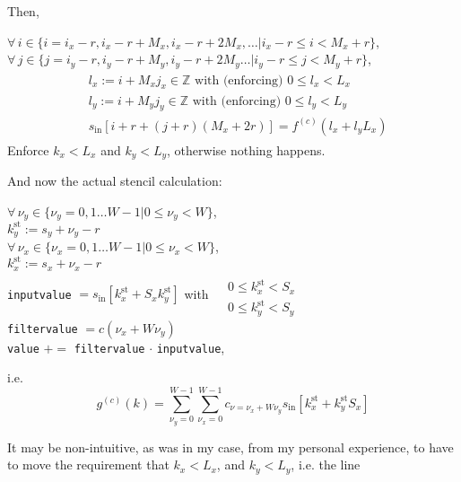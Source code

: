 \documentclass[10pt]{amsart}
\begin{document}
\begin{multicols*}{2}
Then,

$\forall \, i \in \lbrace i = i_x -r, i_x - r +M_x, i_x -r + 2M_x, \dots | i_x - r \leq i < M_x + r \rbrace$, \\
\phantom{ \qquad \, } $\forall \, j \in \lbrace j =i_y - r , i_y - r + M_y, i_y -r + 2M_y \dots | i_y - r \leq j < M_y + r \rbrace$,
\[
\begin{gathered}
  \begin{aligned}
    & l_x := i + M_x j_x \in \mathbb{Z} \text{ with (enforcing) } 0 \leq l_x < L_x \\ 
    & l_y := i + M_y j_y \in \mathbb{Z} \text{ with (enforcing) } 0 \leq l_y < L_y \\ 
    & s_{\text{in}}[i+r + (j+r)(M_x + 2r) ] = f^{(c)}(l_x + l_yL_x)
    \end{aligned}
\end{gathered}
\]
Enforce $k_x <L_x$ and $k_y <L_y$, otherwise nothing happens.  

And now the actual stencil calculation:

$\forall \, \nu_y \in \lbrace \nu_y = 0 , 1 \dots W-1 | 0 \leq \nu_y < W \rbrace$, \\
\phantom{ \qquad \, } $k_y^{\text{st}} := s_y + \nu_y - r$ \\
\phantom{ \qquad \, } $\forall \, \nu_x \in \lbrace \nu_x = 0 , 1 \dots W-1 | 0 \leq \nu_x < W \rbrace$, \\
\phantom{ \qquad \qquad \, } $k_x^{\text{st}} := s_x + \nu_x -r $ \\
\phantom{ \qquad \qquad \, } \verb|inputvalue| $=s_{\text{in}}[k^{\text{st}}_x + S_x k_y^{\text{st}}]$ with $\begin{aligned} & \quad \\
  & 0 \leq k_x^{\text{st}} < S_x \\ 
  & 0 \leq k_y^{\text{st}} < S_y  \end{aligned}$ \\
\phantom{ \qquad \qquad \, } \verb|filtervalue| $ = c(\nu_x + W\nu_y)$  \\
\phantom{ \qquad \qquad \, } \verb|value| $+=$ \verb|filtervalue| $\cdot$ \verb|inputvalue|,

i.e.
\[
g^{(c)}(k) = \sum_{\nu_y=0}^{W-1} \sum_{\nu_x =0}^{W-1} c_{\nu = \nu_x + W \nu_y} s_{\text{in}}[k_x^{\text{st}} + k_y^{\text{st}}S_x]
\]

\hrulefill

It may be non-intuitive, as was in my case, from my personal experience, to have to move the requirement that $k_x < L_x$, and $k_y <L_y$, i.e. the line


\end{multicols*}
\end{document}
